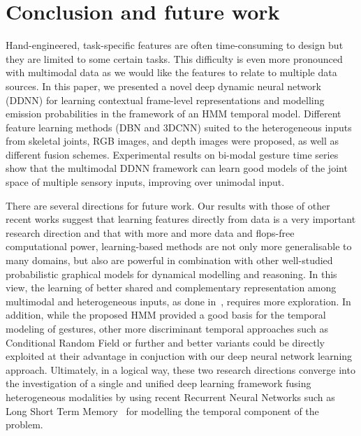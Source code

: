 
\section{Conclusion and future work}
\label{sec:conclusion}

Hand-engineered, task-specific features are often time-consuming to design but they are limited to some certain tasks. %
This difficulty is even more pronounced with multimodal data as we would like the features
to relate to multiple data sources.
%
In this paper, we presented a novel deep dynamic neural network (DDNN)
for learning contextual frame-level representations and modelling emission probabilities in the framework of an HMM temporal model.
%
Different feature learning methods (DBN and 3DCNN) suited to the heterogeneous inputs from skeletal joints, RGB images, and depth images
were proposed, as well as different fusion schemes.
%
Experimental results on bi-modal gesture time series  show that the multimodal DDNN framework can learn
good models of the joint space of multiple sensory inputs, improving over  unimodal input.



There are several directions for future work.
%
Our results with those of other recent works suggest that learning features directly from data is a very important research direction
and that with more and more data and flops-free  computational power, learning-based methods are not only more generalisable to many domains,
but also are powerful in combination  with other well-studied probabilistic graphical models
for dynamical modelling and reasoning.
%
In this view, the learning of  better shared and complementary representation among multimodal  and heterogeneous  inputs,
as done in~\cite{neverova2014moddrop}, requires more exploration.
%
In addition, while the proposed HMM provided a good basis for the temporal modeling of gestures,
other more discriminant temporal approaches such as Conditional Random Field or further and better variants
\cite{wang2006hidden} could be directly exploited at their advantage in conjuction with our deep neural network  learning approach.
%
Ultimately, in a logical way, these two research directions converge into the investigation of
a single and unified deep learning framework fusing heterogeneous modalities
by using recent Recurrent Neural Networks such as Long Short Term Memory~\cite{graves2009novel} for modelling the temporal component of the problem.


\endinput
